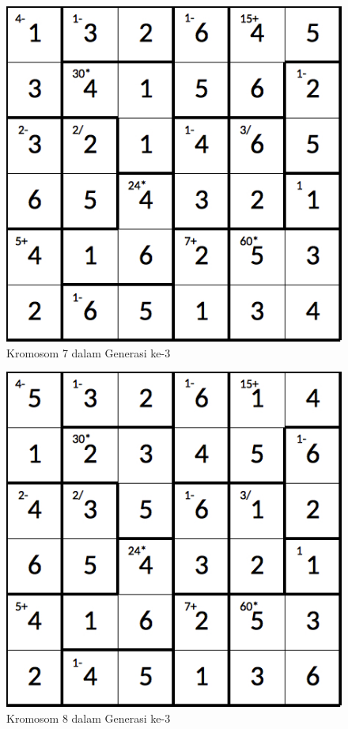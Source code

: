 \begin{figure}
\centering
\captionsetup{justification=centering}
\includegraphics[scale=0.333]{Gambar/hybridgenetic/Generation3Chromosome7}
\caption[Kromosom 7 dalam Generasi ke-3]{Kromosom 7 dalam Generasi ke-3}
\label{fig:analisisg3k7}
\end{figure}

\begin{figure}
\centering
\captionsetup{justification=centering}
\includegraphics[scale=0.333]{Gambar/hybridgenetic/Generation3Chromosome8}
\caption[Kromosom 8 dalam Generasi ke-3]{Kromosom 8 dalam Generasi ke-3}
\label{fig:analisisg3k8}
\end{figure}

